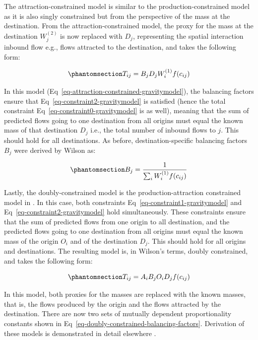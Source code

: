 \documentclass[
  10pt,
  letterpaper,
]{article}
\begin{document}
The attraction-constrained model is similar to the
production-constrained model as it is also singly constrained but from
the perspective of the mass at the destination. From the
attraction-constrained model, the proxy for the mass at the destination
\(W_j^{(2)}\) is now replaced with \(D_j\), representing the spatial
interaction inbound flow e.g., flows attracted to the destination, and
takes the following form:

\begin{equation}\phantomsection\label{eq-attraction-constrained-gravitymodel}{
T_{ij} = B_j D_j W_i^{(1)} f(c_{ij})
}\end{equation}

In this model (Eq~\ref{eq-attraction-constrained-gravitymodel}), the
balancing factors ensure that Eq~\ref{eq-constraint2-gravitymodel} is
satisfied (hence the total constraint
Eq~\ref{eq-constraint0-gravitymodel} is as well), meaning that the sum
of predicted flows going to one destination from all origins must equal
the known mass of that destination \(D_j\) i.e., the total number of
inbound flows to \(j\). This should hold for all destinations. As
before, destination-specific balancing factors \(B_j\) were derived by
Wilson as:

\begin{equation}\phantomsection\label{eq-attraction-constrained-balancing-factor}{
B_j = \frac{1}{\sum_i W_i^{(1)} f(c_{ij})}
}\end{equation}

Lastly, the doubly-constrained model is the production-attraction
constrained model in \citet{wilson1971}. In this case, both constraints
Eq~\ref{eq-constraint1-gravitymodel} and
Eq~\ref{eq-constraint2-gravitymodel} hold simultaneously. These
constraints ensure that the sum of predicted flows from one origin to
all destination, and the predicted flows going to one destination from
all origins must equal the known mass of the origin \(O_i\) and of the
destination \(D_j\). This should hold for all origins and destinations.
The resulting model is, in Wilson's terms, doubly constrained, and takes
the following form:

\begin{equation}\phantomsection\label{eq-doubly-constrained-gravitymodel}{
T_{ij} = A_i B_j O_i D_j f(c_{ij})
}\end{equation}

In this model, both proxies for the masses are replaced with the known
masses, that is, the flows produced by the origin and the flows
attracted by the destination. There are now two sets of mutually
dependent proportionality constants shown in
Eq~\ref{eq-doubly-constrained-balancing-factors}. Derivation of these
models is demonstrated in detail elsewhere
\citep[e.g.,][]{ortuzar_2011_modelling, wilsonSTATISTICALTHEORYSPATIAL1967}.
\end{document}
